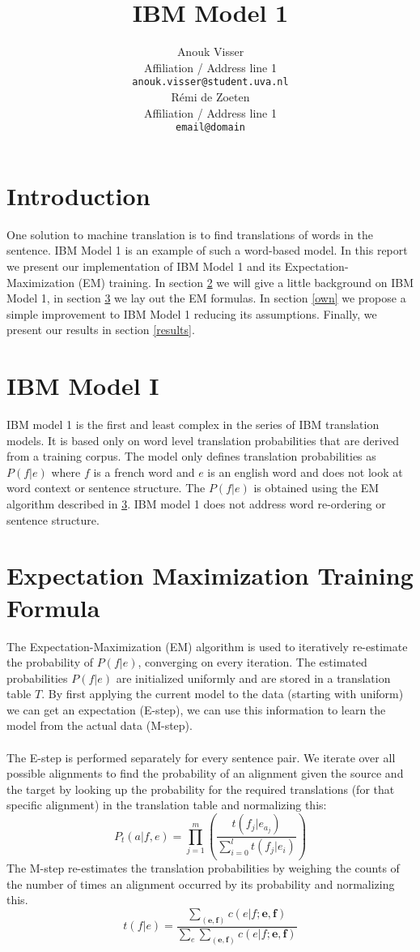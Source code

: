 \documentclass[11pt]{article}
\title{IBM Model 1}
\author{Anouk Visser \\
  Affiliation / Address line 1 \\
  {\tt anouk.visser@student.uva.nl} \\\And
  R\'emi de Zoeten \\
  Affiliation / Address line 1 \\
  {\tt email@domain} \\}
\date{}
\begin{document}
\maketitle

\section{Introduction}
One solution to machine translation is to find translations of words in the sentence. IBM Model 1 is an example of such a word-based model. In this report we present our implementation of IBM Model 1 and its Expectation-Maximization (EM) training. In section \ref{IBM} we will give a little background on IBM Model 1, in section \ref{em} we lay out the EM formulas. In section \ref{own} we propose a simple improvement to IBM Model 1 reducing its assumptions. Finally, we present our results in section \ref{results}.


\section{IBM Model I}
\label{IBM}
IBM model 1 is the first and least complex in the series of IBM translation models. It is based only on word level translation probabilities that are derived from a training corpus. The model only defines translation probabilities as $P(f|e)$ where $f$ is a french word and $e$ is an english word and does not look at word context or sentence structure. The $P(f|e)$ is obtained using the EM algorithm described in \ref{em}. IBM model 1 does not address word re-ordering or sentence structure.

\section{Expectation Maximization Training Formula}
\label{em}
The Expectation-Maximization (EM) algorithm is used to iteratively re-estimate the probability of $P(f|e)$, converging on every iteration. The estimated probabilities $P(f|e)$ are initialized uniformly and are stored in a translation table $T$. By first applying the current model to the data (starting with uniform) we can get an expectation (E-step), we can use this information to learn the model from the actual data (M-step).\\\\
The E-step is performed separately for every sentence pair. We iterate over all possible alignments to find the probability of an alignment given the source and the target by looking up the probability for the required translations (for that specific alignment) in the translation table and normalizing this: 
$$P_t(a|f, e) = \prod\limits_{j=1}^{m} (\frac{t(f_j|e_{a_{j}})}{\sum\limits_{i=0}^{l}t(f_j|e_i)})$$
The M-step re-estimates the translation probabilities by weighing the counts of the number of times an alignment occurred by its probability and normalizing this. 
$$t(f|e) = \frac{\sum\limits_{(\textbf{e}, \textbf{f})} c(e|f; \textbf{e}, \textbf{f})}{\sum\limits_{e}\sum\limits_{(\textbf{e}, \textbf{f})} c(e|f; \textbf{e}, \textbf{f})}$$
\end{document}
